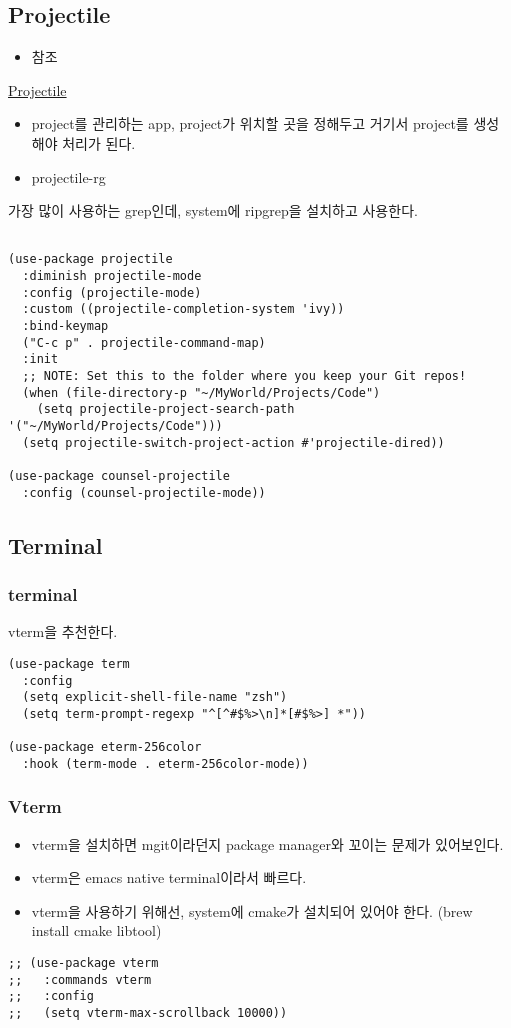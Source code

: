 \documentclass[11pt]{article}
\begin{document}
\subsection*{Projectile}
\label{sec:orgcd80b3d}

\begin{itemize}
\item 참조
\end{itemize}
\href{https://projectile.mx/}{Projectile} 
\begin{itemize}
\item project를 관리하는 app, project가 위치할 곳을 정해두고 거기서 project를 생성해야 처리가 된다.
\item projectile-rg
\end{itemize}
가장 많이 사용하는 grep인데, system에 ripgrep을 설치하고 사용한다.

\begin{verbatim}

(use-package projectile
  :diminish projectile-mode
  :config (projectile-mode)
  :custom ((projectile-completion-system 'ivy))
  :bind-keymap
  ("C-c p" . projectile-command-map)
  :init
  ;; NOTE: Set this to the folder where you keep your Git repos!
  (when (file-directory-p "~/MyWorld/Projects/Code")
    (setq projectile-project-search-path '("~/MyWorld/Projects/Code")))
  (setq projectile-switch-project-action #'projectile-dired))

(use-package counsel-projectile
  :config (counsel-projectile-mode))

\end{verbatim}
\subsection*{Terminal}
\label{sec:org0e3497d}
\subsubsection*{terminal}
\label{sec:orgc9d3576}
vterm을 추천한다.
\begin{verbatim}
(use-package term
  :config
  (setq explicit-shell-file-name "zsh")
  (setq term-prompt-regexp "^[^#$%>\n]*[#$%>] *"))

(use-package eterm-256color
  :hook (term-mode . eterm-256color-mode))

\end{verbatim}
\subsubsection*{Vterm}
\label{sec:orga3593f2}
\begin{itemize}
\item vterm을 설치하면 mgit이라던지 package manager와 꼬이는 문제가 있어보인다.
\item vterm은 emacs native terminal이라서 빠르다.
\item vterm을 사용하기 위해선, system에 cmake가 설치되어 있어야 한다. (brew install cmake libtool)
\end{itemize}
\begin{verbatim}
;; (use-package vterm
;;   :commands vterm
;;   :config
;;   (setq vterm-max-scrollback 10000))
\end{verbatim}
\end{document}
